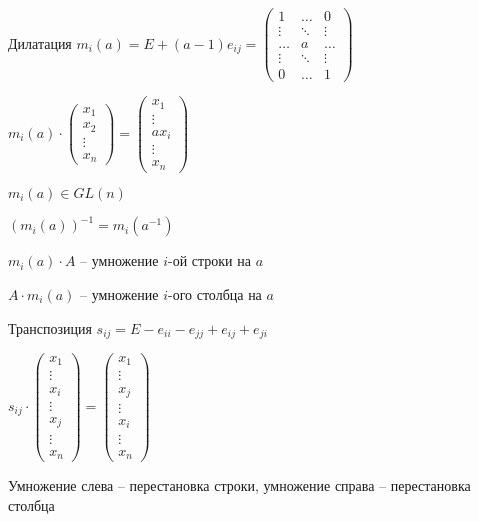 \documentclass[12pt]{article}
\begin{document}
\begin{defin}{Дилатация}
    $m_i(a) = E + (a - 1)e_{ij} = \begin{pmatrix}
        1 & \ldots & 0 \\
        \vdots & \ddots & \vdots \\
        \ldots & a & \ldots \\
        \vdots & \ddots & \vdots \\
        0 & \ldots & 1
    \end{pmatrix}$
\end{defin}

\begin{Example}{}
    $m_i(a) \cdot \begin{pmatrix}
        x_1 \\
        x_2 \\
        \vdots \\
        x_n
    \end{pmatrix} = \begin{pmatrix}
        x_1 \\
        \vdots \\
        ax_i \\
        \vdots \\
        x_n
    \end{pmatrix}$

    $m_i(a) \in GL(n)$

    $(m_i(a))^{-1} = m_i(a^{-1})$

    $m_i(a) \cdot A$ -- умножение $i$-ой строки на $a$

    $A \cdot m_i(a)$ -- умножение $i$-ого столбца на $a$
\end{Example}

\begin{defin}{Транспозиция}
    $s_{ij} = E - e_{ii} - e_{jj} + e_{ij} + e_{ji}$
    
    $s_{ij} \cdot \begin{pmatrix}
        x_1 \\
        \vdots \\
        x_i \\
        \vdots \\
        x_j \\
        \vdots \\
        x_n
    \end{pmatrix} = \begin{pmatrix}
        x_1 \\
        \vdots \\
        x_j \\
        \vdots \\
        x_i \\
        \vdots \\
        x_n
    \end{pmatrix}$

    Умножение слева -- перестановка строки, умножение справа -- перестановка столбца
\end{defin}
\end{document}

